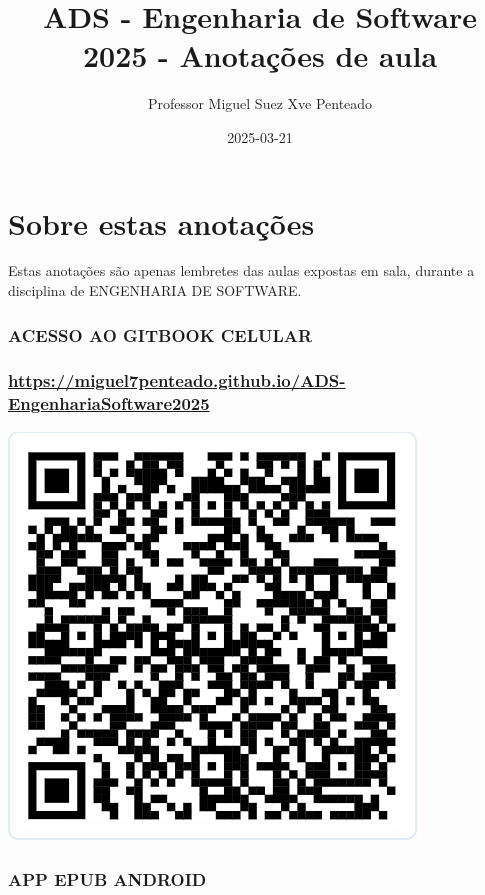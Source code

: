 \documentclass[
]{book}
\title{ADS - Engenharia de Software 2025 - Anotações de aula}
\author{Professor Miguel Suez Xve Penteado}
\date{2025-03-21}
\begin{document}
\maketitle

{
\setcounter{tocdepth}{1}
\tableofcontents
}
\chapter*{Sobre estas anotações}\label{sobre-estas-anotauxe7uxf5es}

Estas anotações são apenas lembretes das aulas expostas em sala, durante a disciplina de ENGENHARIA DE SOFTWARE.

\subsection{ACESSO AO GITBOOK CELULAR}\label{acesso-ao-gitbook-celular}

\subsection{\texorpdfstring{\url{https://miguel7penteado.github.io/ADS-EngenhariaSoftware2025}}{https://miguel7penteado.github.io/ADS-EngenhariaSoftware2025}}\label{httpsmiguel7penteado.github.ioads-engenhariasoftware2025}

\includegraphics{images/clipboard-3692082511.png}

\subsection{APP EPUB ANDROID}\label{app-epub-android}
\end{document}
